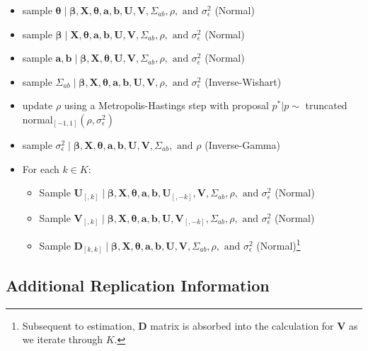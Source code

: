  \begin{itemize}
  \item sample $\bm\theta \; | \;  \bm\beta, \mathbf{X}, \bm\theta, \mathbf{a}, \mathbf{b}, \mathbf{U}, \mathbf{V}, \Sigma_{ab}, \rho, \text{ and } \sigma_{\epsilon}^{2}$ (Normal)
  \item sample $\bm\beta \; | \;  \mathbf{X}, \bm\theta, \mathbf{a}, \mathbf{b}, \mathbf{U}, \mathbf{V}, \Sigma_{ab}, \rho, \text{ and } \sigma_{\epsilon}^{2}$ (Normal)
  \item sample $\mathbf{a}, \mathbf{b} \; | \; \bm\beta, \mathbf{X}, \bm\theta, \mathbf{U}, \mathbf{V}, \Sigma_{ab}, \rho, \text{ and } \sigma_{\epsilon}^{2}$ (Normal)
  \item sample $\Sigma_{ab} \; | \; \bm\beta, \mathbf{X}, \bm\theta, \mathbf{a}, \mathbf{b}, \mathbf{U}, \mathbf{V}, \rho, \text{ and } \sigma_{\epsilon}^{2}$ (Inverse-Wishart)
  \item update $\rho$ using a Metropolis-Hastings step with proposal $p^{*} | p  \sim$ truncated normal$_{[-1,1]}(\rho, \sigma_{\epsilon}^{2})$
  \item sample $\sigma_{\epsilon}^{2} \; | \; \bm\beta, \mathbf{X}, \bm\theta, \mathbf{a}, \mathbf{b}, \mathbf{U}, \mathbf{V}, \Sigma_{ab}, \text{ and } \rho$ (Inverse-Gamma)
  \item For each $k \in K$:
  \begin{itemize}
    \item Sample $\mathbf{U}_{[,k]} \; | \; \bm\beta, \mathbf{X}, \bm\theta, \mathbf{a}, \mathbf{b}, \mathbf{U}_{[,-k]}, \mathbf{V}, \Sigma_{ab}, \rho, \text{ and } \sigma_{\epsilon}^{2}$ (Normal)
    \item Sample $\mathbf{V}_{[,k]} \; | \; \bm\beta, \mathbf{X}, \bm\theta, \mathbf{a}, \mathbf{b}, \mathbf{U}, \mathbf{V}_{[,-k]}, \Sigma_{ab}, \rho, \text{ and } \sigma_{\epsilon}^{2}$ (Normal)
    \item Sample $\mathbf{D}_{[k,k]}  \; | \; \bm\beta, \mathbf{X}, \bm\theta,\mathbf{a}, \mathbf{b}, \mathbf{U}, \mathbf{V}, \Sigma_{ab}, \rho, \text{ and } \sigma_{\epsilon}^{2}$ (Normal)\footnote{Subsequent to estimation, $\mathbf{D}$ matrix is absorbed into the calculation for $\mathbf{V}$ as we iterate through $K$. }
  \end{itemize}
 \end{itemize}

\subsection*{Additional Replication Information}

